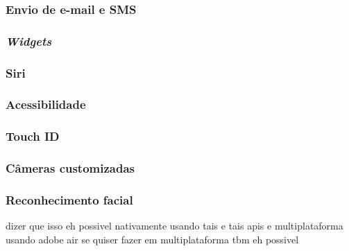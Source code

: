 \subsubsection{Envio de e-mail e SMS} \label{subsubsec:emailsms}


\subsubsection{\textit{Widgets}} \label{subsubsec:widgets}

\subsubsection{Siri} \label{subsubsec:siri}

\subsubsection{Acessibilidade} \label{subsubsec:acessibilidade}

\subsubsection{Touch ID} \label{subsubsec:touchid}

\subsubsection{Câmeras customizadas} \label{subsubsec:customcamera}

\subsubsection{Reconhecimento facial} \label{subsubsec:facial}
dizer que isso eh possivel nativamente usando tais e tais apis e multiplataforma usando adobe air
se quiser fazer em multiplataforma tbm eh possivel
